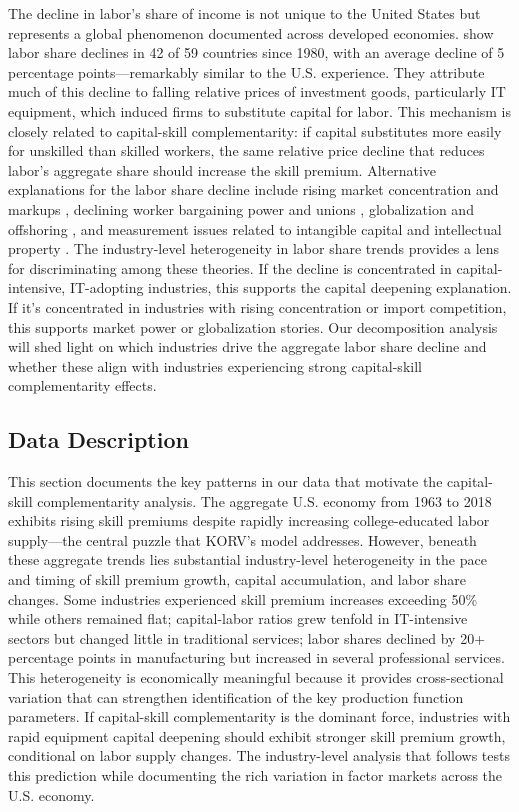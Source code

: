 \documentclass[12pt]{article}
\begin{document}
The decline in labor's share of income is not unique to the United States but represents a global phenomenon documented across developed economies. \citet{karabarbounis2014global} show labor share declines in 42 of 59 countries since 1980, with an average decline of 5 percentage points---remarkably similar to the U.S. experience. They attribute much of this decline to falling relative prices of investment goods, particularly IT equipment, which induced firms to substitute capital for labor. This mechanism is closely related to capital-skill complementarity: if capital substitutes more easily for unskilled than skilled workers, the same relative price decline that reduces labor's aggregate share should increase the skill premium. Alternative explanations for the labor share decline include rising market concentration and markups \citep{autor2020fall}, declining worker bargaining power and unions \citep{stansbury2017labor}, globalization and offshoring \citep{elsby2013decline}, and measurement issues related to intangible capital and intellectual property \citep{koh2020labor}. The industry-level heterogeneity in labor share trends provides a lens for discriminating among these theories. If the decline is concentrated in capital-intensive, IT-adopting industries, this supports the capital deepening explanation. If it's concentrated in industries with rising concentration or import competition, this supports market power or globalization stories. Our decomposition analysis will shed light on which industries drive the aggregate labor share decline and whether these align with industries experiencing strong capital-skill complementarity effects.



\subsection{Data Description}

This section documents the key patterns in our data that motivate the capital-skill complementarity analysis. The aggregate U.S. economy from 1963 to 2018 exhibits rising skill premiums despite rapidly increasing college-educated labor supply---the central puzzle that KORV's model addresses. However, beneath these aggregate trends lies substantial industry-level heterogeneity in the pace and timing of skill premium growth, capital accumulation, and labor share changes. Some industries experienced skill premium increases exceeding 50\% while others remained flat; capital-labor ratios grew tenfold in IT-intensive sectors but changed little in traditional services; labor shares declined by 20+ percentage points in manufacturing but increased in several professional services. This heterogeneity is economically meaningful because it provides cross-sectional variation that can strengthen identification of the key production function parameters. If capital-skill complementarity is the dominant force, industries with rapid equipment capital deepening should exhibit stronger skill premium growth, conditional on labor supply changes. The industry-level analysis that follows tests this prediction while documenting the rich variation in factor markets across the U.S. economy.
\end{document}
